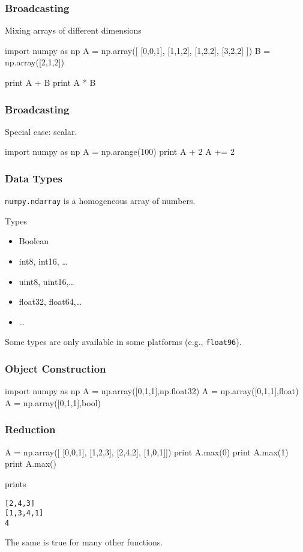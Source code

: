 \begin{frame}[fragile]
\frametitle{Broadcasting}
Mixing arrays of different dimensions

\begin{python}
import numpy as np
A = np.array([
    [0,0,1],
    [1,1,2],
    [1,2,2],
    [3,2,2]
    ])
B = np.array([2,1,2])

print A + B
print A * B
\end{python}
\end{frame}

\begin{frame}[fragile]
\frametitle{Broadcasting}
Special case: scalar.

\begin{python}
import numpy as np
A = np.arange(100)
print A + 2
A += 2
\end{python}
\end{frame}

\begin{frame}[fragile]
\frametitle{Data Types}

\lstinline{numpy.ndarray} is a homogeneous array of numbers.

\begin{block}{Types}
\begin{itemize}
\item Boolean
\item int8, int16, \ldots
\item uint8, uint16,\ldots
\item float32, float64,\ldots
\item \ldots
\end{itemize}
\end{block}

Some types are only available in some platforms (e.g., \lstinline{float96}).

\end{frame}

\begin{frame}[fragile]
\frametitle{Object Construction}

\begin{python}
import numpy as np
A = np.array([0,1,1],np.float32)
A = np.array([0,1,1],float)
A = np.array([0,1,1],bool)
\end{python}
\end{frame}

\begin{frame}[fragile]
\frametitle{Reduction}

\begin{python}
A = np.array([
    [0,0,1],
    [1,2,3],
    [2,4,2],
    [1,0,1]])
print A.max(0)
print A.max(1)
print A.max()
\end{python}
prints
\begin{verbatim}
[2,4,3]
[1,3,4,1]
4
\end{verbatim}

The same is true for many other functions.
\end{frame}

